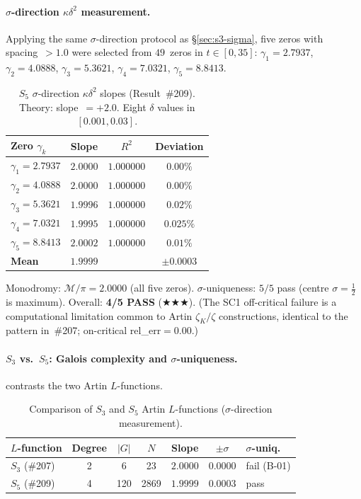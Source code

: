 \documentclass[11pt, a4paper]{article}
\theoremstyle{plain}
\theoremstyle{definition}
\newcommand{\kap}{\kappa}             %
\newcommand{\mono}{\mathcal{M}}       %
\begin{document}
\paragraph{$\sigma$-direction $\kap\delta^{2}$ measurement.}
Applying the same $\sigma$-direction protocol as
\S\ref{sec:s3-sigma}, five zeros with spacing~${>}1.0$
were selected from $49$~zeros in $t\in[0,35]$:
$\gamma_{1}=2.7937$, $\gamma_{2}=4.0888$,
$\gamma_{3}=5.3621$, $\gamma_{4}=7.0321$, $\gamma_{5}=8.8413$.

\begin{table}[ht]
\centering
\caption{$S_{5}$ $\sigma$-direction $\kap\delta^{2}$ slopes (Result~\#209).
  Theory: slope~$=+2.0$.  Eight $\delta$ values in $[0.001,0.03]$.}
\label{tab:s5-sigma}
\begin{tabular}{@{}lccc@{}}
\toprule
\textbf{Zero $\gamma_{k}$} & \textbf{Slope} & $R^{2}$ & \textbf{Deviation} \\
\midrule
$\gamma_{1}=2.7937$ & $2.0000$ & $1.000000$ & $0.00\%$ \\
$\gamma_{2}=4.0888$ & $2.0000$ & $1.000000$ & $0.00\%$ \\
$\gamma_{3}=5.3621$ & $1.9996$ & $1.000000$ & $0.02\%$ \\
$\gamma_{4}=7.0321$ & $1.9995$ & $1.000000$ & $0.025\%$ \\
$\gamma_{5}=8.8413$ & $2.0002$ & $1.000000$ & $0.01\%$ \\
\midrule
\textbf{Mean} & $\bm{1.9999}$ & & $\pm\bm{0.0003}$ \\
\bottomrule
\end{tabular}
\end{table}

Monodromy: $\mono/\pi=2.0000$ (all five zeros).
$\sigma$-uniqueness: $5/5$ pass (centre $\sigma=\tfrac{1}{2}$ is maximum).
Overall: \textbf{4/5 PASS} ($\bigstar\bigstar\bigstar$).
(The SC1 off-critical failure is a computational limitation common to
Artin $\zeta_K/\zeta$ constructions, identical to the pattern in~\#207;
on-critical rel\_err${}=0.00$.)

\paragraph{$S_{3}$ vs.\ $S_{5}$: Galois complexity and $\sigma$-uniqueness.}
 contrasts the two Artin $L$-functions.

\begin{table}[ht]
\centering
\caption{Comparison of $S_{3}$ and $S_{5}$ Artin $L$-functions
  ($\sigma$-direction measurement).}
\label{tab:s3-s5-compare}
\begin{tabular}{@{}lcccccl@{}}
\toprule
$L$-\textbf{function} & \textbf{Degree} & $|G|$ & $N$
  & \textbf{Slope} & $\pm\sigma$ & $\sigma$\textbf{-uniq.} \\
\midrule
$S_{3}$ (\#207) & 2 & 6   & 23   & $2.0000$ & $0.0000$ & fail (B-01) \\
$S_{5}$ (\#209) & 4 & 120 & 2869 & $1.9999$ & $0.0003$ & pass \\
\bottomrule
\end{tabular}
\end{table}
\end{document}
